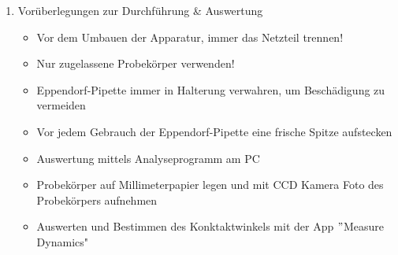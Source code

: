 \documentclass{article}
\begin{document}
\begin{enumerate}[label = (\Roman*)]
    \item Vorüberlegungen zur Durchführung \& Auswertung
        \begin{itemize}
            \item Vor dem Umbauen der Apparatur, immer das Netzteil trennen!
            \item Nur zugelassene Probekörper verwenden!
            \item Eppendorf-Pipette immer in Halterung verwahren, um Beschädigung zu vermeiden
            \item Vor jedem Gebrauch der Eppendorf-Pipette eine frische Spitze aufstecken
            \item Auswertung mittels Analyseprogramm am PC
            \item Probekörper auf Millimeterpapier legen und mit CCD Kamera Foto des Probekörpers aufnehmen
            \item Auswerten und Bestimmen des Konktaktwinkels mit der App $"$Measure Dynamics"
        \end{itemize}
        
\end{enumerate}

\newpage
\end{document}
